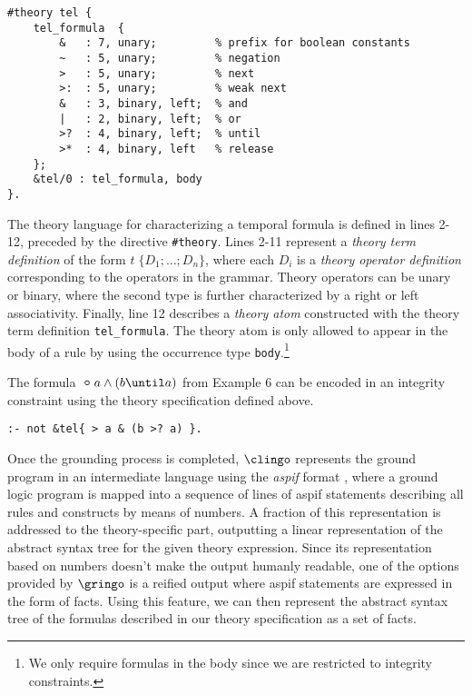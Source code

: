 \begin{center}
    \begin{lstlisting}[] 
#theory tel {
    tel_formula  {
        &   : 7, unary;         % prefix for boolean constants
        ~   : 5, unary;         % negation
        >   : 5, unary;         % next
        >:  : 5, unary;         % weak next
        &   : 3, binary, left;  % and
        |   : 2, binary, left;  % or
        >?  : 4, binary, left;  % until
        >*  : 4, binary, left   % release
    };
    &tel/0 : tel_formula, body
}.
    \end{lstlisting}
\end{center}

The theory language for characterizing a temporal formula is defined in lines 2-12, preceded by the directive \texttt{\#theory}. 
Lines 2-11 represent a \emph{theory term definition} of the form $t \;\{D_1;...;D_n\}$, where each $D_i$ is a \emph{theory operator definition} corresponding to the operators in the grammar. Theory operators can be unary or binary, where the second type is further characterized by a right or left associativity. Finally, line 12 describes a \emph{theory atom} constructed with the theory term definition \texttt{tel\_formula}. The theory atom is only allowed to appear in the body of a rule by using the occurrence type \texttt{body}.\footnote{We only require formulas in the body since we are restricted to integrity constraints.}

\begin{example}
    The formula $\Next a \wedge (b \until a)$ from Example 6 can be encoded in an integrity constraint using the theory specification defined above. 
    \begin{center}
        \begin{lstlisting}[] 
:- not &tel{ > a & (b >? a) }.
        \end{lstlisting}
    \end{center}

\end{example}

Once the grounding process is completed, $\clingo$ represents the ground program in an intermediate language using the \emph{aspif} format \cite{kascwa17a}, where a ground logic program is mapped into a sequence of lines of aspif statements describing all rules and constructs by means of numbers. A fraction of this representation is addressed to the theory-specific part, outputting a linear representation of the abstract syntax tree for the given theory expression. Since its representation based on numbers doesn't make the output humanly readable, one of the options provided by $\gringo$ is a reified output where aspif statements are expressed in the form of facts. Using this feature, we can then represent the abstract syntax tree of the formulas described in our theory specification as a set of facts. 

